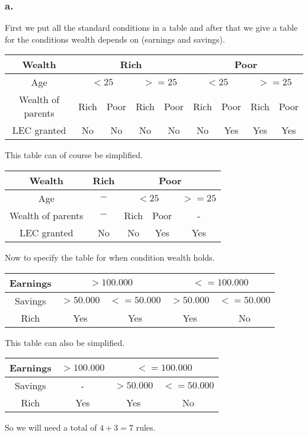 \documentclass[a4paper]{article}
\begin{document}
\subsubsection*{a.}
First we put all the standard conditions in a table and after that we give a table for the conditions wealth depends on (earnings and savings).
\begin{center}
\begin{tabular}{|c|c|c|c|c|c|c|c|c|}
\hline
Wealth & \multicolumn{4}{|c|}{Rich} & \multicolumn{4}{|c|}{Poor}\\
\hline
Age & \multicolumn{2}{|c|}{$<25$} & \multicolumn{2}{|c|}{$>=25$} & \multicolumn{2}{|c|}{$<25$} & \multicolumn{2}{|c|}{$>=25$}\\
\hline
Wealth of parents & Rich & Poor & Rich & Poor & Rich & Poor & Rich & Poor\\
\hline
\hline
LEC granted & No & No & No & No & No & Yes & Yes & Yes \\
\hline
\end{tabular}
\end{center}
This table can of course be simplified.
\begin{flushleft}
\begin{tabular}{|c|c|c|c|c|c|c|c|c|}
\hline
Wealth & \multicolumn{4}{|c|}{Rich} & \multicolumn{4}{|c|}{Poor}\\
\hline
Age & \multicolumn{4}{|c|}{$-$} & \multicolumn{2}{|c|}{$<25$} & \multicolumn{2}{|c|}{$>=25$}\\
\hline
Wealth of parents & \multicolumn{4}{|c|}{$-$} & Rich & Poor &\multicolumn{2}{|c|}{-}\\
\hline
LEC granted & \multicolumn{4}{|c|}{No} & No & Yes & \multicolumn{2}{|c|}{Yes} \\
\hline
\end{tabular}
\end{flushleft}
Now to specify the table for when condition wealth holds.
\begin{flushleft}
\begin{tabular}{|c|c|c|c|c|}
\hline
Earnings & \multicolumn{2}{|c|}{$>100.000$} & \multicolumn{2}{|c|}{$<=100.000$}\\
\hline
Savings & $>50.000$ & $<=50.000$ & $>50.000$ & $<=50.000$\\
\hline
Rich & Yes & Yes & Yes & No\\
\hline
\end{tabular}
\end{flushleft}
This table can also be simplified.
\begin{flushleft}
\begin{tabular}{|c|c|c|c|c|}
\hline
Earnings & \multicolumn{2}{|c|}{$>100.000$} & \multicolumn{2}{|c|}{$<=100.000$}\\
\hline
Savings & \multicolumn{2}{|c|}{-} & $>50.000$ & $<=50.000$\\
\hline
Rich & \multicolumn{2}{|c|}{Yes} & Yes & No\\
\hline
\end{tabular}
\end{flushleft}
So we will need a total of $4 + 3 = 7$ rules.
\end{document}
